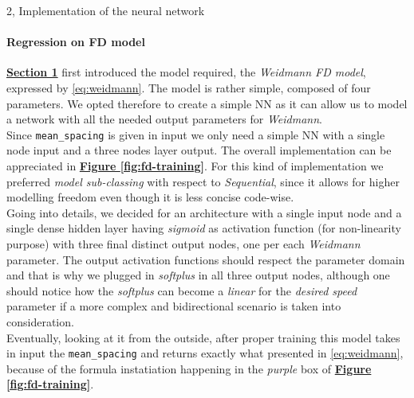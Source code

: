 \documentclass[10pt,a4paper]{article}
\begin{document}
\begin{task}{2, Implementation of the neural network}
\paragraph{Regression on FD model}
\textbf{\hyperref[sec:intro]{Section 1}} first introduced the model required, the \textit{Weidmann FD model}, expressed by \eqref{eq:weidmann}. The model is rather simple, composed of four parameters. We opted therefore to create a simple NN as it can allow us to model a network with all the needed output parameters for \textit{Weidmann}.\\
Since \texttt{mean\_spacing} is given in input we only need a simple NN with a single node input and a three nodes layer output. The overall implementation can be appreciated in \textbf{\hyperref[fig:fd-training]{Figure \ref{fig:fd-training}}}. For this kind of implementation we preferred \textit{model sub-classing} with respect to \textit{Sequential}, since it allows for higher modelling freedom even though it is less concise code-wise.\\
Going into details, we decided for an architecture with a single input node and a single dense hidden layer having \textit{sigmoid} as activation function (for non-linearity purpose) with three final distinct output nodes, one per each \textit{Weidmann} parameter. The output activation functions should respect the parameter domain and that is why we plugged in \textit{softplus} in all three output nodes, although one should notice how the \textit{softplus} can become a \textit{linear} for the \textit{desired speed} parameter if a more complex and bidirectional scenario is taken into consideration.\\
Eventually, looking at it from the outside, after proper training this model takes in input the \texttt{mean\_spacing} and returns exactly what presented in \eqref{eq:weidmann}, because of the formula instatiation happening in the \textit{purple} box of \textbf{\hyperref[fig:fd-training]{Figure \ref{fig:fd-training}}}.


\end{task}
\end{document}
